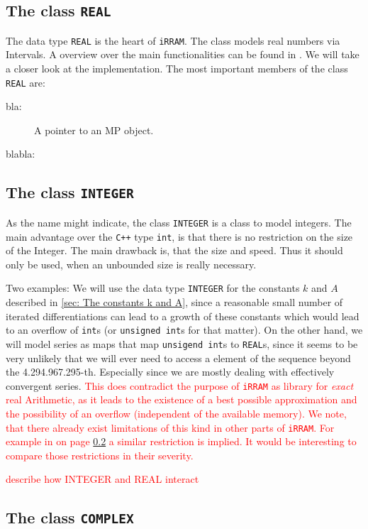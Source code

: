 \documentclass{article}
\newcommand{\irram}{\texttt{iRRAM}\xspace}
\newcommand{\cc}{\texttt{C++}\xspace}
\newcommand{\ir}[1]{\texttt{#1}}
\newcommand{\code}[1]{\texttt{#1}}
\newcommand{\temp}[1]{\textcolor{red}{#1}}
\begin{document}
\subsection{The class \ir{REAL}}

The data type \ir{REAL} is the heart of \irram. The class models real numbers via Intervals. A overview over the main functionalities can be found in \cite{}. We will take a closer look at the implementation. The most important members of the class \ir{REAL} are:
\begin{description}
\item[bla:] A pointer to an MP object.
\item[blabla:]
\end{description}

\subsection{The class \ir{INTEGER}}

As the name might indicate, the class \ir{INTEGER} is a class to model integers. The main advantage over the \cc type \code{int}, is that there is no restriction on the size of the Integer. The main drawback is, that the size and speed. Thus it should only be used, when an unbounded size is really necessary.

Two examples: We will use the data type \ir{INTEGER} for the constants $k$ and $A$ described in \cref{sec: The constants k and A}, since a reasonable small number of iterated differentiations can lead to a growth of these constants which would lead to an overflow of \code{int}s (or \code{unsigned int}s for that matter). On the other hand, we will model series as maps that map \code{unsigend int}s to \code{REAL}s, since it seems to be very unlikely that we will ever need to access a element of the sequence beyond the 4.294.967.295-th. Especially since we are mostly dealing with effectively convergent series. \temp{This does contradict the purpose of \irram as library for \emph{exact} real Arithmetic, as it leads to the existence of a best possible approximation and the possibility of an overflow (independent of the available memory). We note, that there already exist limitations of this kind in other parts of \irram. For example in \cite{} on page \ref{} a similar restriction is implied. It would be interesting to compare those restrictions in their severity.}

\temp{describe how INTEGER and REAL interact}

\subsection{The class \ir{COMPLEX}}\label{sec: The class COMPLEX}
\end{document}
